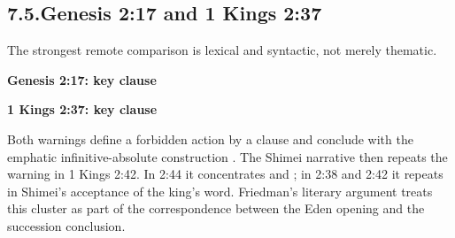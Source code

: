 \subsection*{7.5.\quad Genesis 2:17 and 1 Kings 2:37}

The strongest remote comparison is lexical and syntactic, not merely thematic.

\noindent
\begin{minipage}[t]{0.48\linewidth}
{\centering\textbf{Genesis 2:17: key clause}\par}
\end{minipage}
\hfill
\begin{minipage}[t]{0.48\linewidth}
{\centering\textbf{1 Kings 2:37: key clause}\par}
\end{minipage}

Both warnings define a forbidden action by a  clause and conclude with the emphatic infinitive-absolute construction .  The Shimei narrative then repeats the warning in 1 Kings 2:42.  In 2:44 it concentrates  and ; in 2:38 and 2:42 it repeats  in Shimei's acceptance of the king's word.  Friedman's literary argument treats this cluster as part of the correspondence between the Eden opening and the succession conclusion.\cite{Friedman1998}

